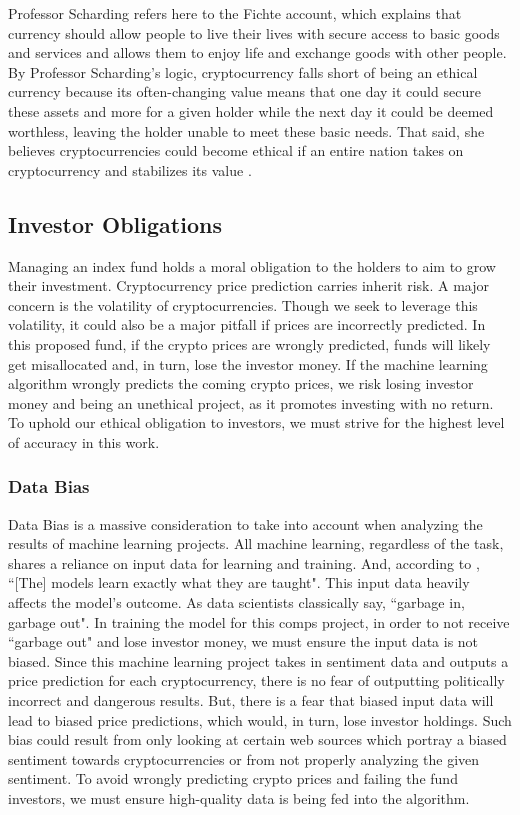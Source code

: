 \documentclass[10pt,twocolumn]{article}
\begin{document}
Professor Scharding refers here to the Fichte account, which explains that currency should allow people to live their lives with secure access to basic goods and services and allows them to enjoy life and exchange goods with other people. By Professor Scharding's logic, cryptocurrency falls short of being an ethical currency because its often-changing value means that one day it could secure these assets and more for a given holder while the next day it could be deemed worthless, leaving the holder unable to meet these basic needs. That said, she believes cryptocurrencies could become ethical if an entire nation takes on cryptocurrency and stabilizes its value \cite{IsBitcoinEthical}.

\subsection{Investor Obligations}

Managing an index fund holds a moral obligation to the holders to aim to grow their investment. Cryptocurrency price prediction carries inherit risk. A major concern is the volatility of cryptocurrencies. Though we seek to leverage this volatility, it could also be a major pitfall if prices are incorrectly predicted. In this proposed fund, if the crypto prices are wrongly predicted, funds will likely get misallocated and, in turn, lose the investor money. If the machine learning algorithm wrongly predicts the coming crypto prices, we risk losing investor money and being an unethical project, as it promotes investing with no return. To uphold our ethical obligation to investors, we must strive for the highest level of accuracy in this work.

\subsubsection{Data Bias}

Data Bias is a massive consideration to take into account when analyzing the results of machine learning projects. All machine learning, regardless of the task, shares a reliance on input data for learning and training. And, according to , ``[The] models learn exactly what they are taught". This input data heavily affects the model's outcome. As data scientists classically say, ``garbage in, garbage out". In training the model for this comps project, in order to not receive ``garbage out" and lose investor money, we must ensure the input data is not biased. Since this machine learning project takes in sentiment data and outputs a price prediction for each cryptocurrency, there is no fear of outputting politically incorrect and dangerous results. But, there is a fear that biased input data will lead to biased price predictions, which would, in turn, lose investor holdings. Such bias could result from only looking at certain web sources which portray a biased sentiment towards cryptocurrencies or from not properly analyzing the given sentiment. To avoid wrongly predicting crypto prices and failing the fund investors, we must ensure high-quality data is being fed into the algorithm.
\end{document}
